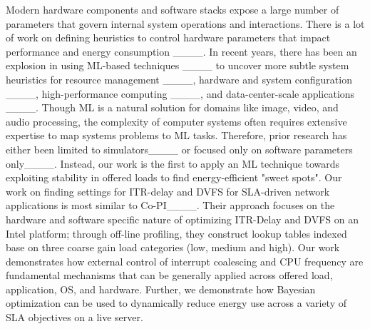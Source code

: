 Modern hardware components and software stacks expose a large number of parameters that govern internal system operations and interactions. There is a lot of work on defining heuristics to control hardware parameters that impact performance and energy consumption ____. In recent years, there has been an explosion in using ML-based techniques ____ to uncover more subtle system heuristics for resource management ____, hardware and system configuration ____, high-performance computing ____, and data-center-scale applications ____. Though ML is a natural solution for domains like image, video, and audio processing, the complexity of computer systems often requires extensive expertise to map systems problems to ML tasks. Therefore, prior research has either been limited to simulators____ or focused only on software parameters only____. Instead, our work is the first to apply an ML technique towards exploiting stability in offered loads to find energy-efficient "sweet spots". Our work on finding settings for ITR-delay and DVFS for SLA-driven network applications is most similar to Co-PI____. Their approach focuses on the hardware and software specific nature of optimizing ITR-Delay and DVFS on an Intel platform; through off-line profiling, they construct lookup tables indexed base on three coarse gain load categories (low, medium and high). Our work demonstrates how external control of interrupt coalescing and CPU frequency are fundamental mechanisms that can be generally applied across offered load, application, OS, and hardware. Further, we demonstrate how Bayesian optimization can be used to dynamically reduce energy use across a variety of SLA objectives on a live server.